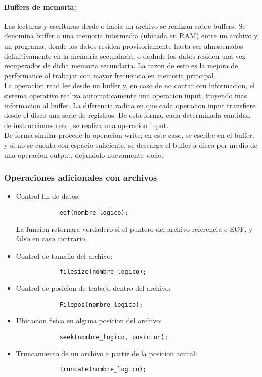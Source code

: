 \paragraph{Buffers de memoria:} Las lecturas y escrituras desde o hacia un archivo se realizan sobre buffers. Se denomina buffer a una memoria intermedia (ubicada en RAM) entre un archivo y un programa, donde los datos residen provisoriamente hasta ser almacenados definitivamente en la memoria secundaria, o dodnde los datos residen una vez recuperados de dicha memoria secundaria. La razon de esto es la mejora de performance al trabajar con mayor frecuencia en memoria principal. \\
La operacion read lee desde un buffer y, en caso de no contar con informacion, el sistema operativo realiza automaticamente una operacion input, trayendo mas informacion al buffer. La diferencia radica en que cada operacion input transfiere desde el disco una serie de registros. De esta forma, cada determinada cantidad de instrucciones read, se realiza una operacion input.\\
De forma similar procede la operacion write; en este caso, se escribe en el buffer, y si no se cuenta con espacio suficiente, se descarga el buffer a disco por medio de una operacion output, dejandolo nuevamente vacio.

\subsubsection{Operaciones adicionales con archivos}

\begin{itemize}
    \item Control fin de datos:
        \begin{lstlisting}
            eof(nombre_logico);
        \end{lstlisting}
    La funcion retornara verdadero si el puntero del archivo referencia e EOF, y falso en caso contrario.
    \item Control de tamaño del archivo:
        \begin{lstlisting}
            filesize(nombre_logico);
        \end{lstlisting}
    \item Control de posicion de trabajo dentro del archivo:
        \begin{lstlisting}
            Filepos(nombre_logico);
        \end{lstlisting}
    \item Ubicacion fisica en alguna posicion del archivo:
        \begin{lstlisting}
            seek(nombre_logico, posicion);
        \end{lstlisting}
    \item Truncamiento de un archivo a partir de la posicion acutal:
        \begin{lstlisting}
            truncate(nombre_logico);
        \end{lstlisting}
\end{itemize}
